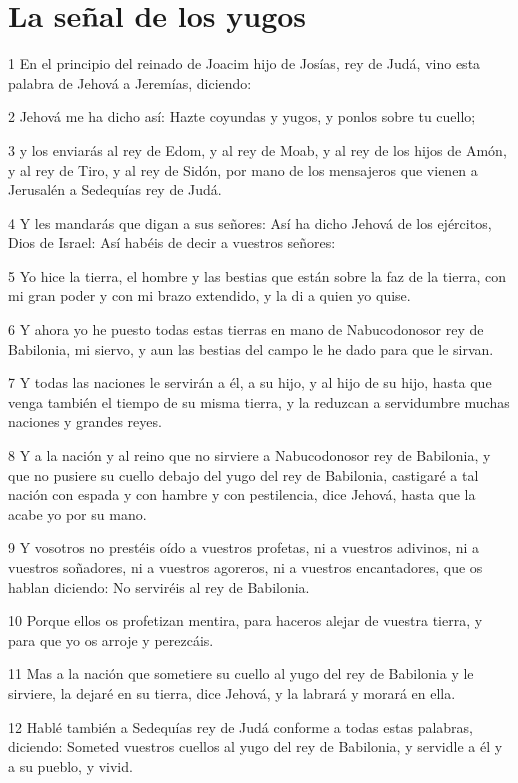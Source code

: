 \section*{La señal de los yugos}

\par 1 En el principio del reinado de Joacim hijo de Josías, rey de Judá, vino esta palabra de Jehová a Jeremías, diciendo:
\par 2 Jehová me ha dicho así: Hazte coyundas y yugos, y ponlos sobre tu cuello;
\par 3 y los enviarás al rey de Edom, y al rey de Moab, y al rey de los hijos de Amón, y al rey de Tiro, y al rey de Sidón, por mano de los mensajeros que vienen a Jerusalén a Sedequías rey de Judá.
\par 4 Y les mandarás que digan a sus señores: Así ha dicho Jehová de los ejércitos, Dios de Israel: Así habéis de decir a vuestros señores:
\par 5 Yo hice la tierra, el hombre y las bestias que están sobre la faz de la tierra, con mi gran poder y con mi brazo extendido, y la di a quien yo quise.
\par 6 Y ahora yo he puesto todas estas tierras en mano de Nabucodonosor rey de Babilonia, mi siervo, y aun las bestias del campo le he dado para que le sirvan.
\par 7 Y todas las naciones le servirán a él, a su hijo, y al hijo de su hijo, hasta que venga también el tiempo de su misma tierra, y la reduzcan a servidumbre muchas naciones y grandes reyes.
\par 8 Y a la nación y al reino que no sirviere a Nabucodonosor rey de Babilonia, y que no pusiere su cuello debajo del yugo del rey de Babilonia, castigaré a tal nación con espada y con hambre y con pestilencia, dice Jehová, hasta que la acabe yo por su mano.
\par 9 Y vosotros no prestéis oído a vuestros profetas, ni a vuestros adivinos, ni a vuestros soñadores, ni a vuestros agoreros, ni a vuestros encantadores, que os hablan diciendo: No serviréis al rey de Babilonia.
\par 10 Porque ellos os profetizan mentira, para haceros alejar de vuestra tierra, y para que yo os arroje y perezcáis.
\par 11 Mas a la nación que sometiere su cuello al yugo del rey de Babilonia y le sirviere, la dejaré en su tierra, dice Jehová, y la labrará y morará en ella.
\par 12 Hablé también a Sedequías rey de Judá conforme a todas estas palabras, diciendo: Someted vuestros cuellos al yugo del rey de Babilonia, y servidle a él y a su pueblo, y vivid.
